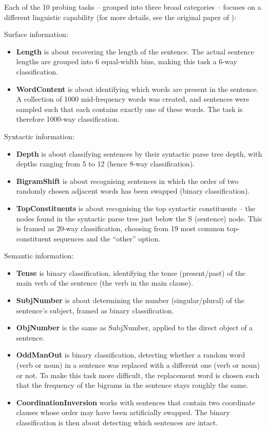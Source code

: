 \documentclass[bsc,frontabs,twoside,singlespacing,parskip,deptreport]{infthesis}
\begin{document}
{{    Each of the 10 probing tasks -- grouped into three broad categories -- focuses on a different linguistic capability (for more details, see the original paper of \citet{Conneau_2018}):
    
    Surface information:
    \begin{itemize}
      \item \textbf{Length} is about recovering the length of the sentence. The actual sentence lengths are grouped into 6 equal-width bins, making this task a 6-way classification.
      \item \textbf{WordContent} is about identifying which words are present in the sentence. A collection of 1000 mid-frequency words was created, and sentences were sampled such that each contains exactly one of these words. The task is therefore 1000-way classification.
    \end{itemize}
    Syntactic information:
    \begin{itemize}
      \item \textbf{Depth} is about classifying sentences by their syntactic parse tree depth, with depths ranging from 5 to 12 (hence 8-way classification).
      \item \textbf{BigramShift} is about recognising sentences in which the order of two randomly chosen adjacent words has been swapped (binary classification).
      \item \textbf{TopConstituents} is about recognising the top syntactic constituents -- the nodes found in the syntactic parse tree just below the S (sentence) node. This is framed as 20-way classification, choosing from 19 most common top-constituent sequences and the ``other'' option.
    \end{itemize}
    Semantic information:
    \begin{itemize}
      \item \textbf{Tense} is binary classification, identifying the tense (present/past) of the main verb of the sentence (the verb in the main clause).
      \item \textbf{SubjNumber} is about determining the number (singular/plural) of the sentence's subject, framed as binary classification.
      \item \textbf{ObjNumber} is the same as SubjNumber, applied to the direct object of a sentence.
      \item \textbf{OddManOut} is binary classification, detecting whether a random word (verb or noun) in a sentence was replaced with a different one (verb or noun) or not. To make this task more difficult, the replacement word is chosen such that the frequency of the bigrams in the sentence stays roughly the same.
      \item \textbf{CoordinationInversion} works with sentences that contain two coordinate clauses whose order may have been artificially swapped. The binary classification is then about detecting which sentences are intact.
    \end{itemize}

}}
\end{document}
